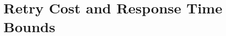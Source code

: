 \documentclass[conference,letterpaper]{IEEEtran}
\begin{document}

\section{Retry Cost and Response Time Bounds}\label{fblt rc}
\end{document}
